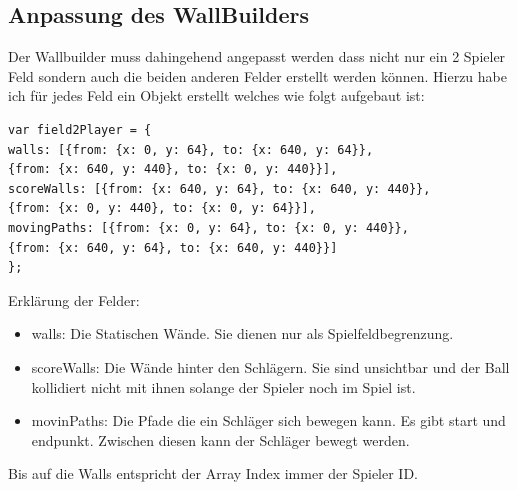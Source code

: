 \subsection{Anpassung des WallBuilders}
Der Wallbuilder muss dahingehend angepasst werden dass nicht nur ein 2 Spieler Feld sondern auch die beiden anderen Felder erstellt werden können.
Hierzu habe ich für jedes Feld ein Objekt erstellt welches wie folgt aufgebaut ist:
\begin{lstlisting}
var field2Player = {
walls: [{from: {x: 0, y: 64}, to: {x: 640, y: 64}},
{from: {x: 640, y: 440}, to: {x: 0, y: 440}}],
scoreWalls: [{from: {x: 640, y: 64}, to: {x: 640, y: 440}},
{from: {x: 0, y: 440}, to: {x: 0, y: 64}}],
movingPaths: [{from: {x: 0, y: 64}, to: {x: 0, y: 440}},
{from: {x: 640, y: 64}, to: {x: 640, y: 440}}]
};
\end{lstlisting}
Erklärung der Felder:
\begin{itemize}
	\item
	walls: Die Statischen Wände. Sie dienen nur als Spielfeldbegrenzung.
	\item
	scoreWalls: Die Wände hinter den Schlägern. Sie sind unsichtbar und der Ball kollidiert nicht mit ihnen solange der Spieler noch im Spiel ist.
	\item
	movinPaths: Die Pfade die ein Schläger sich bewegen kann. Es gibt start und endpunkt. Zwischen diesen kann der Schläger bewegt werden.
\end{itemize}
Bis auf die Walls entspricht der Array Index immer der Spieler ID.
